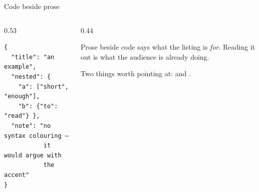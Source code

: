 \documentclass[aspectratio=169]{beamer}
\begin{document}
\begin{frame}[fragile]{Code beside prose}

  \begin{columns}[T]
    \begin{column}{0.53\textwidth}
      \vspace{0pt}
\begin{lstlisting}
{
  "title": "an example",
  "nested": {
    "a": ["short", "enough"],
    "b": {"to": "read"} },
  "note": "no syntax colouring —
           it would argue with
           the accent"
}
\end{lstlisting}
    \end{column}
    \begin{column}{0.44\textwidth}
      \vspace{0pt}
      {\small\setlength{\parskip}{0.7em}%
      Prose beside code says what the listing is \emph{for}. Reading it out is
      what the audience is already doing.

      Two things worth pointing at:  and .\par}
    \end{column}
  \end{columns}

\end{frame}


\end{document}
